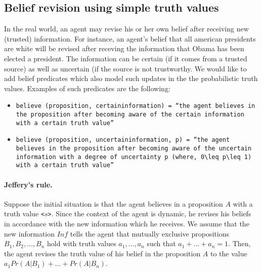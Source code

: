 \documentclass[12pt]{article}
\begin{document}



\subsection{Belief revision using simple truth values} In the real world, an agent may revise his or her own belief after receiving new (trusted) information. For instance, an agent's belief that all american presidents are white will be revised after receving the information that Obama has been elected a president. The information can be certain (if it comes from a trusted source) as well as uncertain (if the source is not trustworthy. We would like to add belief predicates which also model such updates in the the probabilistic truth values. Examples of such predicates are the following:

\begin{itemize}
\item
\texttt{believe (proposition, certaininformation) = ``the agent \\ believes in the proposition after becoming aware of the\\ certain information with a certain truth value''}

\item
\texttt{believe (proposition, uncertaininformation, p) = ``the agent believes in the proposition after becoming aware of the \\ uncertain information with a degree of uncertainty p (where, $0\leq p\leq 1) $ with a certain truth value''}

\end{itemize}


\paragraph{Jeffery's rule.} Suppose the initial situation is that the agent believes in a proposition $A$ with a truth value \texttt{<$s$>}. Since the context of the agent is dynamic, he revises his beliefs in accordance with the new information which he receives. We assume that the new information $Inf$ tells the agent that mutually exclusive propositions $B_1, B_2, \ldots, B_n$ hold with truth values $a_1,\ldots,a_n$ such that $a_1+\ldots+a_n=1$. Then, the agent revises the truth value of his belief in the proposition $A$ to the value $a_1 Pr(A|B_1) + \ldots + Pr(A|B_n)$.
\end{document}
